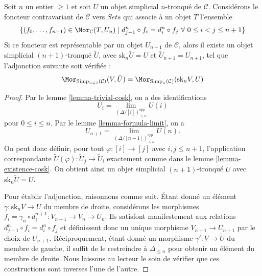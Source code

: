 \begin{lemma}
\label{lemma-work-out}
Soit $n$ un entier $\geq 1$ et soit $U$ un objet simplicial $n$-tronqué
de $\mathcal{C}$. Considérons le foncteur contravariant de $\mathcal{C}$
vers $\textit{Sets}$ qui associe à un objet $T$ l'ensemble
$$
\{ (f_0, \ldots, f_{n + 1}) \in \Mor_\mathcal{C}(T, U_n)
\mid
d^n_{j - 1} \circ f_i = d^n_i \circ f_j
\ \forall\ 0\leq i < j\leq n + 1\}
$$
Si ce foncteur est représentable par un objet $U_{n + 1}$ de
$\mathcal{C}$, alors il existe un objet simplicial $(n + 1)$-tronqué
$\tilde U$, avec $\text{sk}_n \tilde U = U$ et
$\tilde U_{n + 1} = U_{n + 1}$, tel que l'adjonction suivante soit vérifiée :
$$
\Mor_{\text{Simp}_{n + 1}(\mathcal{C})}(V, \tilde U)
=
\Mor_{\text{Simp}_n(\mathcal{C})}(\text{sk}_nV, U)
$$
\end{lemma}

\begin{proof}
Par le lemme \ref{lemma-trivial-cosk}, on a des identifications
$$
U_i = \lim_{(\Delta/[i])_{\leq n}^{opp}} U(i)
$$
pour $0 \leq i \leq n$. Par le lemme \ref{lemma-formula-limit}, on a
$$
U_{n + 1} = \lim_{(\Delta/[n + 1])_{\leq n}^{opp}} U(n).
$$
On peut donc définir, pour tout $\varphi : [i] \to [j]$ avec
$i, j \leq n + 1$, l'application correspondante
$\tilde U(\varphi) : \tilde U_j \to \tilde U_i$ exactement comme dans le
lemme \ref{lemma-existence-cosk}. On obtient ainsi un objet simplicial
$(n + 1)$-tronqué $\tilde U$ avec $\text{sk}_n \tilde U = U$.

\medskip\noindent
Pour établir l'adjonction, raisonnons comme suit. Étant donné un élément
$\gamma : \text{sk}_n V \to U$ du membre de droite, considérons les morphismes
$f_i = \gamma_n \circ d^{n + 1}_i : V_{n + 1} \to V_n \to U_n$.
Ils satisfont manifestement aux relations
$d^n_{j - 1} \circ f_i = d^n_i \circ f_j$ et définissent donc un unique
morphisme $V_{n + 1} \to U_{n + 1}$ par le choix de $U_{n + 1}$.
Réciproquement, étant donné un morphisme $\gamma' : V \to \tilde U$ du
membre de gauche, il suffit de le restreindre à $\Delta_{\leq n}$ pour
obtenir un élément du membre de droite. Nous laissons au lecteur le soin
de vérifier que ces constructions sont inverses l'une de l'autre.
\end{proof}


